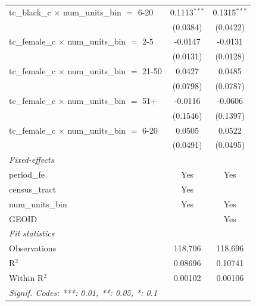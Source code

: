 \begin{tabular}{lcc}
   tc\_black\_c $\times$ num\_units\_bin $=$ 6-20        & 0.1113$^{***}$  & 0.1315$^{***}$\\   
                                                         & (0.0384)        & (0.0422)\\   
   tc\_female\_c $\times$ num\_units\_bin $=$ 2-5        & -0.0147         & -0.0131\\   
                                                         & (0.0131)        & (0.0128)\\   
   tc\_female\_c $\times$ num\_units\_bin $=$ 21-50      & 0.0427          & 0.0485\\   
                                                         & (0.0798)        & (0.0787)\\   
   tc\_female\_c $\times$ num\_units\_bin $=$ 51+        & -0.0116         & -0.0606\\   
                                                         & (0.1546)        & (0.1397)\\   
   tc\_female\_c $\times$ num\_units\_bin $=$ 6-20       & 0.0505          & 0.0522\\   
                                                         & (0.0491)        & (0.0495)\\   
   \midrule
   \emph{Fixed-effects}\\
   period\_fe                                            & Yes             & Yes\\  
   census\_tract                                         & Yes             & \\  
   num\_units\_bin                                       & Yes             & Yes\\  
   GEOID                                                 &                 & Yes\\  
   \midrule
   \emph{Fit statistics}\\
   Observations                                          & 118,706         & 118,696\\  
   R$^2$                                                 & 0.08696         & 0.10741\\  
   Within R$^2$                                          & 0.00102         & 0.00106\\  
   \midrule \midrule
   \multicolumn{3}{l}{\emph{Signif. Codes: ***: 0.01, **: 0.05, *: 0.1}}\\
\end{tabular}
\par\endgroup
\begingroup
